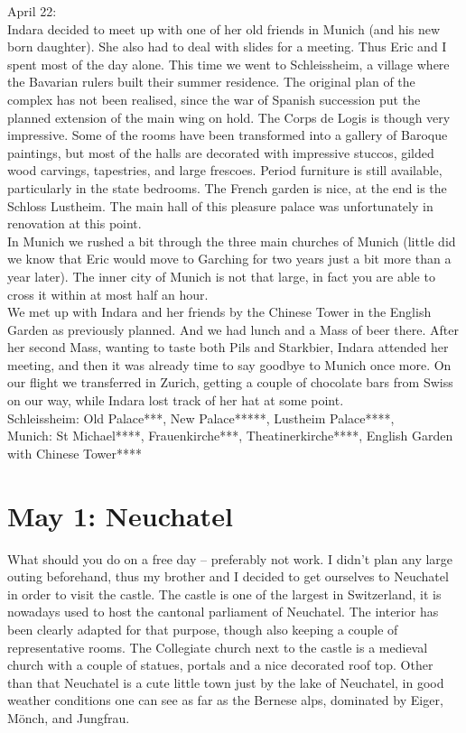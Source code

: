 April 22:\\
Indara decided to meet up with one of her old friends in Munich (and his new born daughter). She also had to deal with slides for a meeting. Thus Eric and I spent most of the day alone. This time we went to Schleissheim, a village where the Bavarian rulers built their summer residence. The original plan of the complex has not been realised, since the war of Spanish succession put the planned extension of the main wing on hold. The Corps de Logis is though very impressive. Some of the rooms have been transformed into a gallery of Baroque paintings, but most of the halls are decorated with impressive stuccos, gilded wood carvings, tapestries, and large frescoes. Period furniture is still available, particularly in the state bedrooms. The French garden is nice, at the end is the Schloss Lustheim. The main hall of this pleasure palace was unfortunately in renovation at this point.\\
In Munich we rushed a bit through the three main churches of Munich (little did we know that Eric would move to Garching for two years just a bit more than a year later). The inner city of Munich is not that large, in fact you are able to cross it within at most half an hour.\\ 
We met up with Indara and her friends by the Chinese Tower in the English Garden as previously planned. And we had lunch and a Mass of beer there. After her second Mass, wanting to taste both Pils and Starkbier, Indara attended her meeting, and then it was already time to say goodbye to Munich once more. On our flight we transferred in Zurich, getting a couple of chocolate bars from Swiss on our way, while Indara lost track of her hat at some point.\\

Schleissheim: Old Palace***, New Palace*****, Lustheim Palace****, \\
Munich: St Michael****, Frauenkirche***, Theatinerkirche****, English Garden with Chinese Tower****

\section{May 1: Neuchatel}
\label{Neuchatel2014}

What should you do on a free day -- preferably not work. I didn't plan any large outing beforehand, thus my brother and I decided to get ourselves to Neuchatel in order to visit the castle. The castle is one of the largest in Switzerland, it is nowadays used to host the cantonal parliament of Neuchatel. The interior has been clearly adapted for that purpose, though also keeping a couple of representative rooms. The Collegiate church next to the castle is a medieval church with a couple of statues, portals and a nice decorated roof top. Other than that Neuchatel is a cute little town just by the lake of Neuchatel, in good weather conditions one can see as far as the Bernese alps, dominated by Eiger, M\"onch, and Jungfrau.\\

